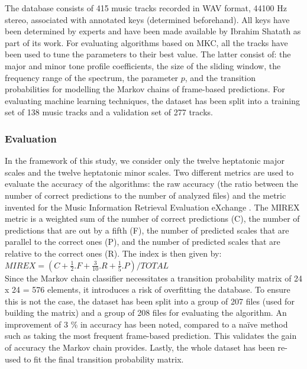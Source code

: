 \documentclass[letterpaper]{article}
\begin{document}
The database consists of 415 music tracks recorded in WAV format, 44100 Hz stereo, associated with annotated keys (determined beforehand).
All keys have been determined
by experts and have been made available by Ibrahim Shat\textquotesingle ath as part of its work. For evaluating algorithms based on MKC,
all the tracks have been used to tune the parameters to their best value. The latter consist of: the major and minor tone profile coefficients,
the size of the sliding window, the frequency range of the spectrum, the parameter $p$, and the transition probabilities for modelling the Markov chains of frame-based predictions. For evaluating machine learning techniques,
the dataset has been split into a training set of 138 music tracks and a validation set of 277 tracks.

\subsubsection{Evaluation}

In the framework of this study, we consider only the twelve heptatonic major scales and the twelve heptatonic minor scales.
Two different metrics are used to evaluate the accuracy of the algorithms:
the raw accuracy (the ratio between the number of correct predictions to the number of analyzed files) and the metric invented for the Music Information Retrieval Evaluation eXchange \citep{MIREX}.
The MIREX metric is a weighted sum of the number of correct predictions (C), the number of predictions that are out by a fifth (F), the number of predicted scales that are parallel to the correct ones (P), and the number of predicted scales
that are relative to the correct ones (R). The index is then given by: \\

\noindent $ MIREX = (C + \frac{1}{2}.F + \frac{3}{10}.R + \frac{1}{5}.P) / TOTAL $ \\

Since the Markov chain classifier necessitates a transition probability matrix of 24 x 24 = 576 elements, it introduces a risk of overfitting the database. To ensure this is not the case, the dataset has been split into a group of 207 files (used for building the matrix) and a group of 208 files for evaluating the algorithm. An improvement of 3 \% in accuracy has been noted, compared to a naïve method such as taking the most frequent frame-based prediction. This validates the gain of accuracy the Markov chain provides. Lastly, the whole dataset has been re-used to fit the final transition probability matrix.
\end{document}
